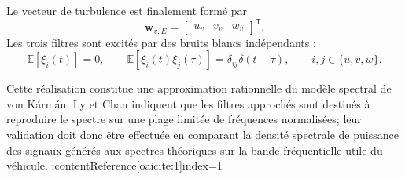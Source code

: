 \documentclass[11pt,a4paper,oneside]{report}
\newcommand{\vect}[1]{\bm{#1}}
\newcommand{\trans}{^{\mathsf T}}
\newcommand{\E}{\mathbb{E}}
\begin{document}
Le vecteur de turbulence est finalement formé par
\begin{equation}
	\vect w_{v,E}
	=
	\begin{bmatrix}
		u_v & v_v & w_v
	\end{bmatrix}\trans.
	\label{eq_vk_turbulence_vector}
\end{equation}
Les trois filtres sont excités par des bruits blancs indépendants :
\begin{equation}
	\E[\xi_i(t)]=0,
	\qquad
	\E[\xi_i(t)\xi_j(\tau)]
	=
	\delta_{ij}\delta(t-\tau),
	\qquad
	i,j\in\{u,v,w\}.
	\label{eq_vk_white_noise_properties}
\end{equation}

Cette réalisation constitue une approximation rationnelle du modèle spectral de von Kármán. Ly et Chan indiquent que les filtres approchés sont destinés à reproduire le spectre sur une plage limitée de fréquences normalisées; leur validation doit donc être effectuée en comparant la densité spectrale de puissance des signaux générés aux spectres théoriques sur la bande fréquentielle utile du véhicule. :contentReference[oaicite:1]{index=1}
	
\end{document}
